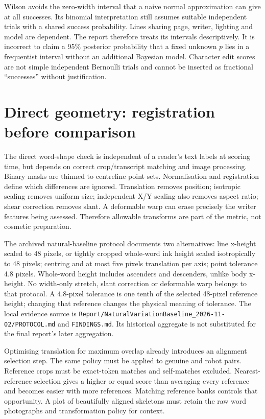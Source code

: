 Wilson avoids the zero-width interval that a naive normal approximation
can give at all successes. Its binomial interpretation still assumes suitable
independent trials with a shared success probability. Lines sharing page,
writer, lighting and model are dependent. The report therefore treats its
intervals descriptively. It is incorrect to claim a 95\% posterior probability
that a fixed unknown $p$ lies in a frequentist interval without an additional
Bayesian model. Character edit scores are not simple independent Bernoulli
trials and cannot be inserted as fractional ``successes'' without justification.

\section{Direct geometry: registration before comparison}
The direct word-shape check is independent of a reader's text labels at
scoring time, but depends on correct crop/transcript matching and image
processing. Binary masks are thinned to centreline point sets. Normalisation
and registration define which differences are ignored. Translation removes
position; isotropic scaling removes uniform size; independent X/Y scaling
also removes aspect ratio; shear correction removes slant. A deformable warp
can erase precisely the writer features being assessed. Therefore allowable
transforms are part of the metric, not cosmetic preparation.

The archived natural-baseline protocol documents two alternatives: line
x-height scaled to 48 pixels, or tightly cropped whole-word ink height scaled
isotropically to 48 pixels; centring and at most five pixels translation per
axis; point tolerance 4.8 pixels. Whole-word height includes ascenders and
descenders, unlike body x-height. No width-only stretch, slant correction or
deformable warp belongs to that protocol. A 4.8-pixel tolerance is one tenth
of the selected 48-pixel reference height; changing that reference changes
the physical meaning of tolerance. The local evidence source is
\texttt{Report/NaturalVariationBaseline\_2026-11-02/PROTOCOL.md} and
\texttt{FINDINGS.md}. Its historical aggregate is not substituted for the
final report's later aggregation.

Optimising translation for maximum overlap already introduces an alignment
selection step. The same policy must be applied to genuine and robot pairs.
Reference crops must be exact-token matches and self-matches excluded.
Nearest-reference selection gives a higher or equal score than averaging
every reference and becomes easier with more references. Matching reference
banks controls that opportunity. A plot of beautifully aligned skeletons
must retain the raw word photographs and transformation policy for context.

